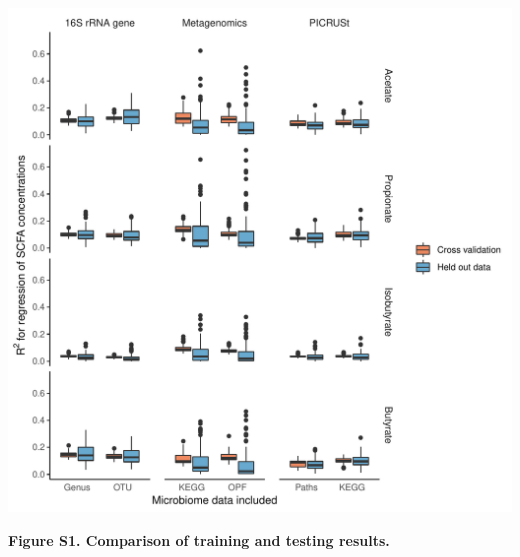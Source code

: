 \documentclass[11pt,]{article}
\begin{document}
\includegraphics{../results/figures/regression_testing.pdf}

\textbf{Figure S1. Comparison of training and testing results.}
\end{document}
